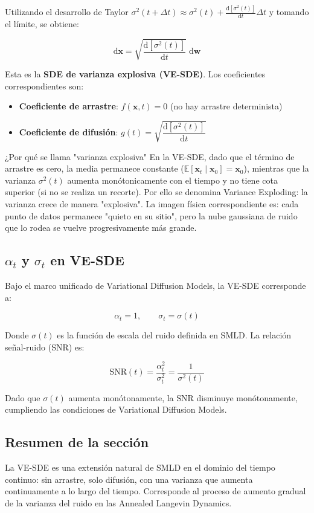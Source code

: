 Utilizando el desarrollo de Taylor $\sigma^2(t+\Delta t) \approx \sigma^2(t) + \frac{\mathrm{d}[\sigma^2(t)]}{\mathrm{d}t}\Delta t$ y tomando el límite, se obtiene:

$$
\mathrm{d}\mathbf{x} = \sqrt{\frac{\mathrm{d}[\sigma^2(t)]}{\mathrm{d}t}}\;\mathrm{d}\mathbf{w}
$$

Esta es la \textbf{SDE de varianza explosiva (VE-SDE)}. Los coeficientes correspondientes son:

\begin{itemize}
    \item \textbf{Coeficiente de arrastre}: $f(\mathbf{x}, t) = 0$ (no hay arrastre determinista)
    \item \textbf{Coeficiente de difusión}: $g(t) = \sqrt{\dfrac{\mathrm{d}[\sigma^2(t)]}{\mathrm{d}t}}$
\end{itemize}

\begin{knowledgebox}{¿Por qué se llama "varianza explosiva"}
En la VE-SDE, dado que el término de arrastre es cero, la media permanece constante ($\mathbb{E}[\mathbf{x}_t \mid \mathbf{x}_0] = \mathbf{x}_0$), mientras que la varianza $\sigma^2(t)$ aumenta monótonicamente con el tiempo y no tiene cota superior (si no se realiza un recorte). Por ello se denomina Variance Exploding: la varianza crece de manera "explosiva". La imagen física correspondiente es: cada punto de datos permanece "quieto en su sitio", pero la nube gaussiana de ruido que lo rodea se vuelve progresivamente más grande.
\end{knowledgebox}

\subsection{$\alpha_t$ y $\sigma_t$ en VE-SDE}

Bajo el marco unificado de Variational Diffusion Models, la VE-SDE corresponde a:

$$
\alpha_t = 1, \qquad \sigma_t = \sigma(t)
$$

Donde $\sigma(t)$ es la función de escala del ruido definida en SMLD. La relación señal-ruido (SNR) es:

$$
\mathrm{SNR}(t) = \frac{\alpha_t^2}{\sigma_t^2} = \frac{1}{\sigma^2(t)}
$$

Dado que $\sigma(t)$ aumenta monótonamente, la SNR disminuye monótonamente, cumpliendo las condiciones de Variational Diffusion Models.

\subsection{Resumen de la sección}

La VE-SDE es una extensión natural de SMLD en el dominio del tiempo continuo: sin arrastre, solo difusión, con una varianza que aumenta continuamente a lo largo del tiempo. Corresponde al proceso de aumento gradual de la varianza del ruido en las Annealed Langevin Dynamics.
